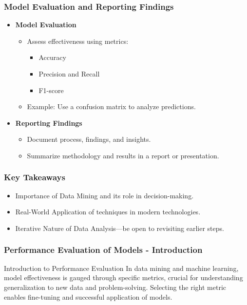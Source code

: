 \documentclass[aspectratio=169]{beamer}
\begin{document}
\begin{frame}
    \frametitle{Model Evaluation and Reporting Findings}
    \begin{itemize}
        \item \textbf{Model Evaluation}
            \begin{itemize}
                \item Assess effectiveness using metrics:
                    \begin{itemize}
                        \item Accuracy
                        \item Precision and Recall
                        \item F1-score
                    \end{itemize}
                \item Example: Use a confusion matrix to analyze predictions.
            \end{itemize}
        
        \item \textbf{Reporting Findings}
            \begin{itemize}
                \item Document process, findings, and insights.
                \item Summarize methodology and results in a report or presentation.
            \end{itemize}
    \end{itemize}
\end{frame}

\begin{frame}
    \frametitle{Key Takeaways}
    \begin{itemize}
        \item Importance of Data Mining and its role in decision-making.
        \item Real-World Application of techniques in modern technologies.
        \item Iterative Nature of Data Analysis—be open to revisiting earlier steps.
    \end{itemize}
\end{frame}

\begin{frame}[fragile]
    \frametitle{Performance Evaluation of Models - Introduction}
    \begin{block}{Introduction to Performance Evaluation}
        In data mining and machine learning, model effectiveness is gauged through specific metrics, crucial for understanding generalization to new data and problem-solving.
        Selecting the right metric enables fine-tuning and successful application of models.
    \end{block}
\end{frame}
\end{document}
